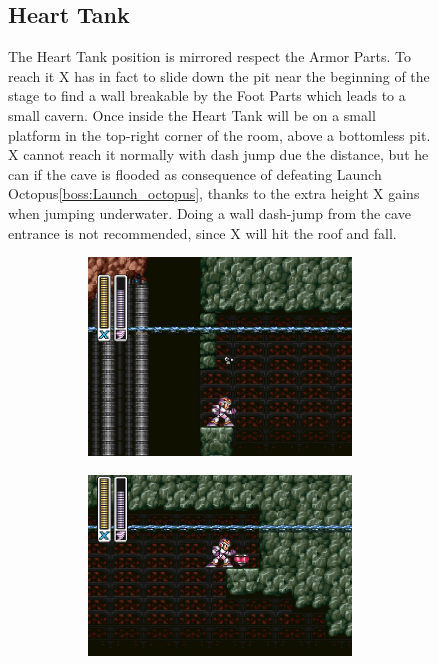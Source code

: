 \begin{figure}[htp]
\subsection{Heart Tank}
The Heart Tank position is mirrored respect the Armor Parts. To reach it X has in fact to slide down the pit near the beginning of the stage to find a wall breakable by the Foot Parts which leads to a small cavern. Once inside the Heart Tank will be on a small platform in the top-right corner of the room, above a bottomless pit. X cannot reach it normally with dash jump due the distance, but he can if  the cave is flooded as consequence of defeating Launch Octopus\ref{boss:Launch_octopus}, thanks to the extra height X gains when jumping underwater. Doing a wall dash-jump from the cave entrance is not recommended, since X will hit the roof and fall.
\begin{figure}[htp]
	\centering
	\begin{subfigure}{0.4\linewidth}
		\centering
		\includegraphics[width=\linewidth]{figures/X1/Sting_chameleon/Sting_heart_1.jpg}
		\caption{}
	\end{subfigure}
	\begin{subfigure}{0.45\linewidth}
		\centering
		\includegraphics[width=\linewidth]{figures/X1/Sting_chameleon/Sting_heart_2.jpg}

\end{subfigure}
\end{figure}
\end{figure}
